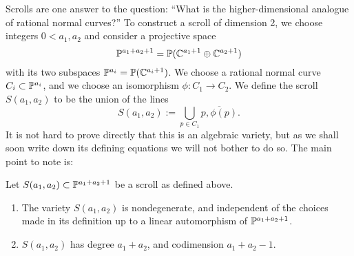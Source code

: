 Scrolls are one answer to the question: ``What is the higher-dimensional analogue of rational normal curves?'' To construct a scroll of dimension 2, we choose integers $0<a_1, a_2$ and consider  a projective space 
$$
\PP^{a_1+a_2+1} = \PP(\CC^{a_1+1}\oplus \CC^{a_2+1})
$$
with its two subspaces $\PP^{a_i} = \PP(\CC^{a_i+1})$. We choose a rational normal curve $C_i\subset \PP^{a_i}$, and we choose an isomorphism $\phi: C_1\to C_2$. We define the scroll $S(a_1, a_2)$ to be the union of the lines
$$
S(a_1,a_2) := \bigcup_{p\in C_1} \overline{p, \phi(p)}.
$$
It is not hard to prove directly that this is an algebraic variety, but as we shall soon write down its defining equations we will not bother to do so. The main point to note is:

\begin{proposition}\label{deg and codim}
Let $S(a_1,a_2)\subset \PP^{a_1+a_2+1}$ be a scroll as defined above.
\begin{enumerate}
 \item The variety $S(a_1,a_2)$ is nondegenerate, and independent of the choices made in its
 definition up to a linear automorphism of $\PP^{a_1+a_2+1}$. 
 \item $S(a_1,a_2)$ has degree $a_1+a_2$, and codimension $a_1+a_2-1.$
\end{enumerate}
\end{proposition}
